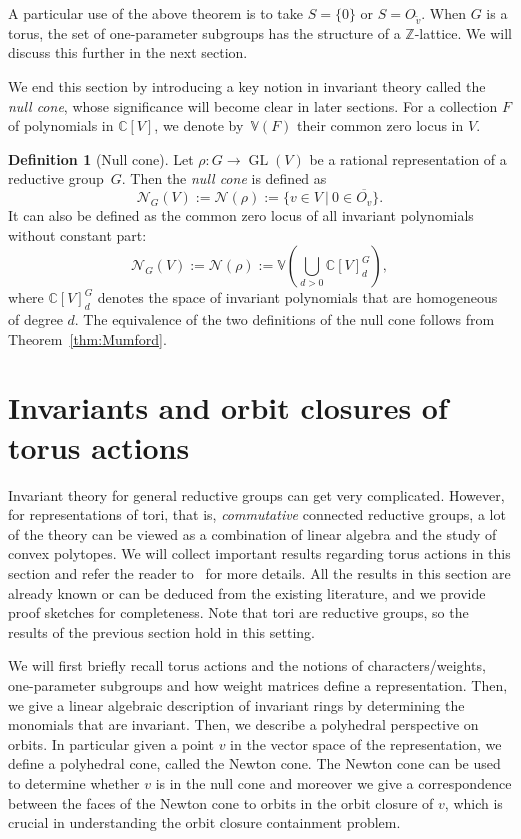 \documentclass[10pt,a4paper]{article}
\DeclareMathOperator{\GL}{GL}
\theoremstyle{definition}
\newtheorem{definition}[theorem]{Definition}
\numberwithin{equation}{section}
\newcommand{\CC}{\mathbb{C}}
\newcommand{\ZZ}{\mathbb{Z}}
\begin{document}
A particular use of the above theorem is to take $S = \{0\}$ or $S = O_{\tilde v}$.
When $G$ is a torus, the set of one-parameter subgroups has the structure of a $\ZZ$-lattice. We will discuss this further in the next section.


We end this section by introducing a key notion in invariant theory called the \emph{null cone}, whose significance will become clear in later sections.
For a collection $F$ of polynomials in $\CC[V]$, we denote by~$\mathbb{V}(F)$ their common zero locus in $V$.

\begin{definition}[Null cone]\label{def:null}
Let $\rho\colon G \rightarrow \GL(V)$ be a rational representation of a reductive group~$G$.
Then the \emph{null cone} is defined as
\[
\mathcal{N}_G(V) := \mathcal{N}(\rho) := \{v \in V\ |\ 0 \in \overline{O_v}\}.
\]
It can also be defined as the common zero locus of all invariant polynomials without constant part:
\[
\mathcal{N}_G(V) := \mathcal{N}(\rho) := \mathbb{V}(\bigcup_{d > 0} \CC[V]^G_d),
\]
where $\CC[V]^G_d$ denotes the space of invariant polynomials that are homogeneous of degree $d$.
The equivalence of the two definitions of the null cone follows from Theorem~\ref{thm:Mumford}.
\end{definition}

%
\section{Invariants and orbit closures of torus actions}\label{sec:rep-tori}
%
Invariant theory for general reductive groups can get very complicated.
However, for representations of tori, that is, \emph{commutative} connected reductive groups, a lot of the theory can be viewed as a combination of linear algebra and the study of convex polytopes.
We will collect important results regarding torus actions in this section and refer the reader to~\cite{Wehlau93, DK} for more details.
All the results in this section are already known or can be deduced from the existing literature, and we provide proof sketches for completeness.
Note that tori are reductive groups, so the results of the previous section hold in this setting.

We will first briefly recall torus actions and the notions of characters/weights, one-parameter subgroups and how weight matrices define a representation. Then, we give a linear algebraic description of invariant rings by determining the monomials that are invariant. Then, we describe a polyhedral perspective on orbits. In particular given a point $v$ in the vector space of the representation, we define a polyhedral cone, called the Newton cone. The Newton cone can be used to determine whether $v$ is in the null cone and moreover we give a correspondence between the faces of the Newton cone to orbits in the orbit closure of $v$, which is crucial in understanding the orbit closure containment problem.
\end{document}
